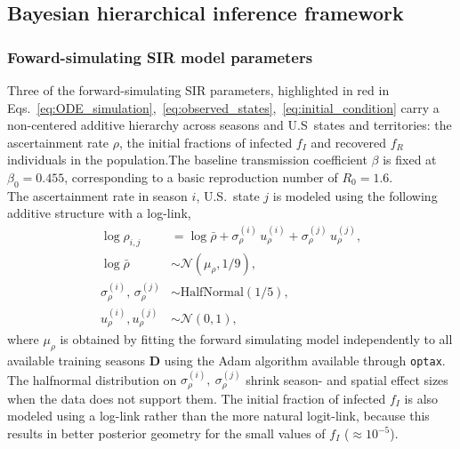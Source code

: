 \documentclass[11pt]{article}
\newcommand{\Normal}{\mathcal{N}}
\newcommand{\HalfNormal}{\text{HalfNormal}}
\begin{document}
\subsection{Bayesian hierarchical inference framework}

\subsubsection*{Foward-simulating SIR model parameters}
Three of the forward-simulating SIR parameters, highlighted in red in Eqs.~\eqref{eq:ODE_simulation},~\eqref{eq:observed_states},~\eqref{eq:initial_condition} carry a non-centered additive hierarchy across seasons and U.S\ states and territories: the ascertainment rate $\rho$, the initial fractions of infected $f_I$ and recovered $f_R$ individuals in the population.The baseline transmission coefficient $\beta$ is fixed at $\beta_0 = 0.455$, corresponding to a basic reproduction number of $R_0 = 1.6$.\\

The ascertainment rate in season $i$, U.S.\ state $j$ is modeled using the following additive structure with a log-link,
\begin{align}
	 \log \rho_{i,j} &= \log \bar{\rho} + \sigma^{(i)}_\rho\, u^{(i)}_{\rho} + \sigma^{(j)}_\rho\, u^{(j)}_{\rho}, \nonumber\\
    \log \bar{\rho} &\sim \Normal\!\left(\mu_{\rho},1/9\right), \nonumber\\
    \sigma^{(i)}_\rho,\, \sigma^{(j)}_\rho &\sim \HalfNormal\! \left( 1/5 \right), \nonumber\\
    u^{(i)}_{\rho}, u^{(j)}_{\rho} &\sim \Normal(0,1),
\end{align}
where $\mu_\rho$ is obtained by fitting the forward simulating model independently to all available training seasons $\bm{D}$ using the Adam algorithm available through \texttt{optax}. The halfnormal distribution on $\sigma_{\rho}^{(i)},~\sigma_{\rho}^{(j)}$ shrink season- and spatial effect sizes when the data does not support them. The initial fraction of infected $f_I$ is also modeled using a log-link rather than the more natural logit-link, because this results in better posterior geometry for the small values of $f_I$ ($\approx 10^{-5}$).\\
\end{document}
